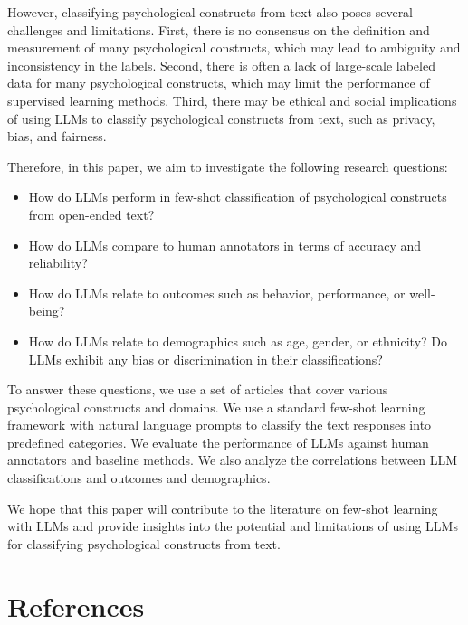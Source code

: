 \documentclass[
  10pt,
  twocolumn]{article}
\providecommand{\tightlist}{%
  \setlength{\itemsep}{0pt}\setlength{\parskip}{0pt}}\usepackage{longtable,booktabs,array}
\begin{document}
However, classifying psychological constructs from text also poses
several challenges and limitations. First, there is no consensus on the
definition and measurement of many psychological constructs, which may
lead to ambiguity and inconsistency in the labels. Second, there is
often a lack of large-scale labeled data for many psychological
constructs, which may limit the performance of supervised learning
methods. Third, there may be ethical and social implications of using
LLMs to classify psychological constructs from text, such as privacy,
bias, and fairness.

Therefore, in this paper, we aim to investigate the following research
questions:

\begin{itemize}
\tightlist
\item
  How do LLMs perform in few-shot classification of psychological
  constructs from open-ended text?
\item
  How do LLMs compare to human annotators in terms of accuracy and
  reliability?
\item
  How do LLMs relate to outcomes such as behavior, performance, or
  well-being?
\item
  How do LLMs relate to demographics such as age, gender, or ethnicity?
  Do LLMs exhibit any bias or discrimination in their classifications?
\end{itemize}

To answer these questions, we use a set of articles that cover various
psychological constructs and domains. We use a standard few-shot
learning framework with natural language prompts to classify the text
responses into predefined categories. We evaluate the performance of
LLMs against human annotators and baseline methods. We also analyze the
correlations between LLM classifications and outcomes and demographics.

We hope that this paper will contribute to the literature on few-shot
learning with LLMs and provide insights into the potential and
limitations of using LLMs for classifying psychological constructs from
text.

\hypertarget{references}{%
\section*{References}\label{references}}
\end{document}
